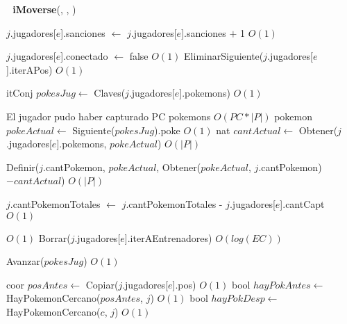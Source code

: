 \begin{Algoritmos}
\begin{algorithm}[H]
\begin{algorithmic}[1]
\end{algorithmic}
\end{algorithm}


$ $\newline
$ $\newline
{\textbf{iMoverse}(, , )}
\begin{algorithmic}[1]

	
	\State $j$.jugadores[$e$].sanciones $\gets$ $j$.jugadores[$e$].sanciones $+$ 1 \Comment $O(1)$
	
	
		\State $j$.jugadores[$e$].conectado $\gets$ false \Comment $O(1)$
		\State EliminarSiguiente($j$.jugadores[$e$].iterAPos) \Comment $O(1)$
	
		\State itConj $pokesJug \gets$ Claves($j$.jugadores[$e$].pokemons) \Comment $O(1)$ 	
		
		   \Comment El jugador pudo haber capturado PC pokemons $O(PC*|P|)$
			\State pokemon $pokeActual \gets$ Siguiente($pokesJug$).poke 	\Comment $O(1)$
			\State nat $cantActual \gets$ Obtener($j$.jugadores[$e$].pokemons, $pokeActual$) \Comment $O(|P|)$
			
			\State Definir($j$.cantPokemon, $pokeActual$, Obtener($pokeActual$, $j$.cantPokemon)$-cantActual$) \Comment $O(|P|)$
		\EndWhile
		
		\State $j$.cantPokemonTotales $\gets$ $j$.cantPokemonTotales - $j$.jugadores[$e$].cantCapt \Comment $O(1)$
		
		   \Comment $O(1)$
			\State Borrar($j$.jugadores[$e$].iterAEntrenadores) \Comment $O(log(EC))$
		\EndIf
		
		\State Avanzar($pokesJug$) \Comment $O(1)$

	\EndIf

\EndIf


	
	\State coor $posAntes \gets$ Copiar($j$.jugadores[$e$].pos)  \Comment $O(1)$
	\State bool $hayPokAntes \gets$ HayPokemonCercano($posAntes$, $j$)  \Comment $O(1)$
	\State bool $hayPokDesp \gets$ HayPokemonCercano($c$, $j$)  \Comment $O(1)$	
	

\end{algorithmic}
\end{Algoritmos}
